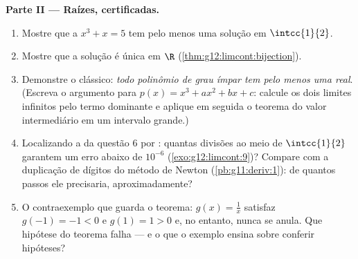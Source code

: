 \begin{problem}
\medskip
\noindent\textbf{Parte II --- Raízes, certificadas.}
\begin{enumerate}[resume]
  \item Mostre que a  $x^3 + x = 5$ tem pelo menos uma
        solução em $\intcc{1}{2}$.
  \item Mostre que a solução é única em $\R$
        (\cref{thm:g12:limcont:bijection}).
  \item Demonstre o clássico: \emph{todo polinômio de grau ímpar
        tem pelo menos uma  real}. (Escreva o argumento para
        $p(x) = x^3 + a x^2 + b x + c$: calcule os dois limites
        infinitos pelo termo dominante e aplique em seguida o
        teorema do valor intermediário em um intervalo grande.)
  \item Localizando a  da questão 6 por : quantas
        divisões ao meio de $\intcc{1}{2}$ garantem um erro
        abaixo de $10^{-6}$ (\cref{exo:g12:limcont:9})? Compare
        com a duplicação de dígitos do método de Newton
        (\cref{pb:g11:deriv:1}): de quantos passos ele precisaria,
        aproximadamente?
  \item O contraexemplo que guarda o teorema: $g(x) = \frac1x$
        satisfaz $g(-1) = -1 < 0$ e $g(1) = 1 > 0$ e, no entanto,
        nunca se anula. Que hipótese do teorema falha --- e o que
        o exemplo ensina sobre conferir hipóteses?
\end{enumerate}


\end{problem}
